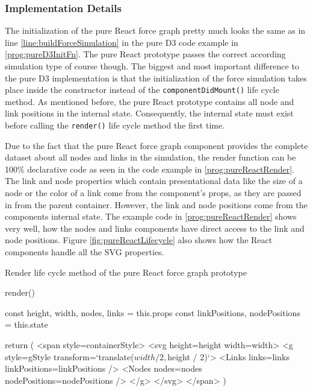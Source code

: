 \subsubsection{Implementation Details}

The initialization of the pure React force graph pretty much looks the same as in line \ref{line:buildForceSimulation} in the pure D3 code example in \ref{prog:pureD3InitFn}. The pure React prototype passes the correct according simulation type of course though. The biggest and most important difference to the pure D3 implementation is that the initialization of the force simulation takes place inside the constructor instead of the \texttt{componentDidMount()} life cycle method. As mentioned before, the pure React prototype contains all node and link positions in the internal state. Consequently, the internal state must exist before calling the \texttt{render()} life cycle method the first time.

Due to the fact that the pure React force graph component provides the complete dataset about all nodes and links in the simulation, the render function can be 100\% declarative code as seen in the code example in \ref{prog:pureReactRender}. The link and node properties which contain presentational data like the size of a node or the color of a link come from the component's props, as they are passed in from the parent container. However, the link and node positions come from the components internal state. The example code in \ref{prog:pureReactRender} shows very well, how the nodes and links components have direct access to the link and node positions. Figure \ref{fig:pureReactLifecycle} also shows how the React components handle all the SVG properties.

\begin{program}
\caption{Render life cycle method of the pure React force graph prototype}
\label{prog:pureReactRender}
\begin{JsCode}
render() {
  const { height, width, nodes, links } = this.props
  const { linkPositions, nodePositions } = this.state
  
  return (
    <span style={containerStyle}>
      <svg height={height} width={width}>
        <g style={gStyle} transform={`translate(${width / 2},${height / 2})`}>
          <Links links={links} linkPositions={linkPositions} />
          <Nodes nodes={nodes} nodePositions={nodePositions} />
        </g>
      </svg>
    </span>
  )
}
\end{JsCode}
\end{program}

